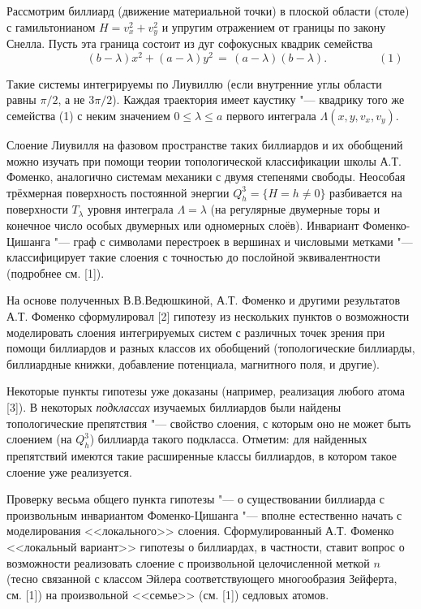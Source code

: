 \vzmscaption

Рассмотрим биллиард (движение материальной точки) в плоской области (столе) с гамильтонианом $H = v_x^2 + v_y^2$ и упругим отражением от границы по закону Снелла. Пусть эта граница состоит из дуг софокусных квадрик семейства
\[ \qquad \qquad \qquad (b - \lambda) x^2 + (a - \lambda) y^2 \, = \, (a - \lambda) (b - \lambda). \qquad\qquad \,\,\, (1)\]

Такие системы интегрируемы по Лиувиллю (если внутренние углы области равны $\pi\slash 2$, а не $3\pi\slash 2$). Каждая траектория имеет каустику "--- квадрику того же семейства (1) с неким значением $0 \le \lambda \le a$ первого интеграла $\Lambda(x, y, v_x, v_y)$.

Слоение Лиувилля на фазовом пространстве таких биллиардов и их обобщений можно изучать при помощи теории топологической классификации школы А.Т. Фоменко, аналогично системам механики с двумя степенями свободы. Неособая трёхмерная поверхность постоянной энергии $Q^3_h = \{H = h \ne 0\}$ разбивается на поверхности $T_\lambda$ уровня интеграла $\Lambda = \lambda$ (на регулярные двумерные торы и конечное число особых двумерных или одномерных слоёв). Инвариант Фоменко-Цишанга "--- граф с символами перестроек в вершинах и числовыми метками "--- классифицирует такие слоения с точностью до послойной эквивалентности (подробнее см. [1]).

На основе полученных В.В.Ведюшкиной, А.Т. Фоменко и другими результатов А.Т. Фоменко сформулировал [2] гипотезу из нескольких пунктов о возможности моделировать слоения интегрируемых систем с различных точек зрения при помощи биллиардов и разных классов их обобщений (топологические биллиарды, биллиардные книжки, добавление потенциала, магнитного поля, и другие).

Некоторые пункты гипотезы уже доказаны (например, реализация любого атома [3]). В некоторых \textit{подклассах} изучаемых биллиардов были найдены топологические препятствия "--- свойство слоения, с которым оно не может быть слоением (на $Q^3_h$) биллиарда такого подкласса. Отметим: для найденных препятствий имеются такие расширенные классы биллиардов, в котором такое слоение уже реализуется.

Проверку весьма общего пункта гипотезы "--- о существовании биллиарда с произвольным инвариантом Фоменко-Цишанга "--- вполне естественно начать с моделирования <<локального>> слоения. Сформулированный А.Т. Фоменко <<локальный вариант>> гипотезы о биллиардах, в частности, ставит вопрос о возможности реализовать слоение с произвольной целочисленной меткой $n$ (тесно связанной с классом Эйлера соответствующего многообразия Зейферта, см. [1]) на произвольной <<семье>> (см. [1]) седловых атомов.

